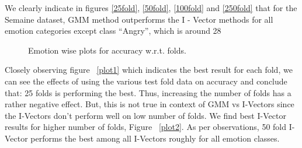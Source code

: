 We clearly indicate in figures  \ref{25fold}, \ref{50fold}, \ref{100fold} and \ref{250fold} that for the Semaine dataset, GMM method outperforms the I - Vector methods for all emotion categories except class “Angry”, which is around 28%


\begin{figure}[ht!]
	\centering
{}
\caption{Emotion wise plots for accuracy w.r.t. folds.}
\end{figure}


Closely observing figure ~\ref{plot1} which indicates the best result for each fold, we can see the effects of using the various test fold data on accuracy and conclude that: 25 folds is performing the best. Thus, increasing the number of folds has a rather negative effect. But, this is not true in context of GMM vs I-Vectors since the I-Vectors don’t perform well on low number of folds. We find best I-Vector results for higher number of folds, Figure ~\ref{plot2}. As per observations, 50 fold I-Vector performs the best among all I-Vectors roughly for all emotion classes.

